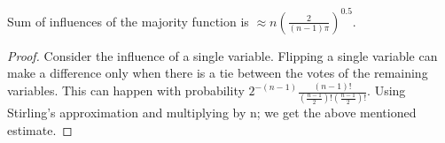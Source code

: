 \documentclass[10pt]{amsart}
\begin{document}
\begin{cor}
Sum of influences of the majority function is $\approx n(\frac{2}{(n-1)\pi})^{0.5}$.
\end{cor}
\begin{proof}
Consider the influence of a single variable. Flipping a single variable can make a difference only when there is a tie between the votes of the remaining variables. This can happen with probability $2^{-(n-1)}\frac{(n-1)!}{(\frac{n-1}{2})!(\frac{n-1}{2})!}$. Using Stirling's approximation and multiplying by n; we get the above mentioned estimate.

\end{proof}


% 
% 
\end{document}
